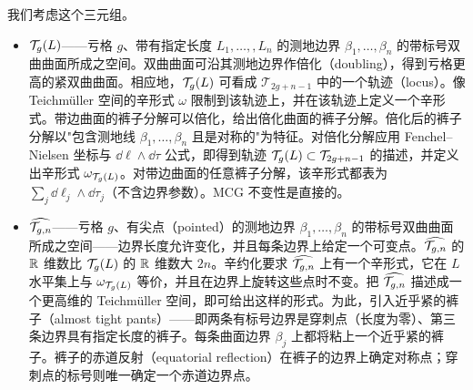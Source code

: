 我们考虑这个三元组。
\begin{itemize}[leftmargin=1.6em,itemsep=2pt,topsep=2pt]
\item $\mathcal{T}_g(L)$——亏格 $g$、带有指定长度 $L_1,\ldots,,L_n$ 的测地边界 $\beta_1,\ldots,\beta_n$ 的带标号双曲曲面所成之空间。双曲曲面可沿其测地边界作倍化（doubling），得到亏格更高的紧双曲曲面。相应地，$\mathcal{T}_g(L)$ 可看成 $\mathcal{T}_{2g+n-1}$ 中的一个轨迹（locus）。像 Teichmüller 空间的辛形式 $\omega$ 限制到该轨迹上，并在该轨迹上定义一个辛形式。带边曲面的裤子分解可以倍化，给出倍化曲面的裤子分解。倍化后的裤子分解以"包含测地线 $\beta_1,\ldots,\beta_n$ 且是对称的"为特征。对倍化分解应用 Fenchel--Nielsen 坐标与 $\dd\ell\wedge\dd\tau$ 公式，即得到轨迹 $\mathcal{T}_g(L)\subset\mathcal{T}_{2g+n-1}$ 的描述，并定义出辛形式 $\omega_{\mathcal{T}_g(L)}$。对带边曲面的任意裤子分解，该辛形式都表为 $\sum_j\dd\ell_j\wedge\dd\tau_j$（不含边界参数）。MCG 不变性是直接的。
\item $\widehat{\mathcal{T}_{g,n}}$——亏格 $g$、有尖点（pointed）的测地边界 $\beta_1,\ldots,\beta_n$ 的带标号双曲曲面所成之空间——边界长度允许变化，并且每条边界上给定一个可变点。$\widehat{\mathcal{T}_{g,n}}$ 的 $\mathbb{R}$ 维数比 $\mathcal{T}_g(L)$ 的 $\mathbb{R}$ 维数大 $2n$。辛约化要求 $\widehat{\mathcal{T}_{g,n}}$ 上有一个辛形式，它在 $L$ 水平集上与 $\omega_{\mathcal{T}_g(L)}$ 等价，并且在边界上旋转这些点时不变。把 $\widehat{\mathcal{T}_{g,n}}$ 描述成一个更高维的 Teichmüller 空间，即可给出这样的形式。为此，引入近乎紧的裤子（almost tight pants）——即两条有标号边界是穿刺点（长度为零）、第三条边界具有指定长度的裤子。每条曲面边界 $\beta_j$ 上都将粘上一个近乎紧的裤子。裤子的赤道反射（equatorial reflection）在裤子的边界上确定对称点；穿刺点的标号则唯一确定一个赤道边界点。
\end{itemize}

%
